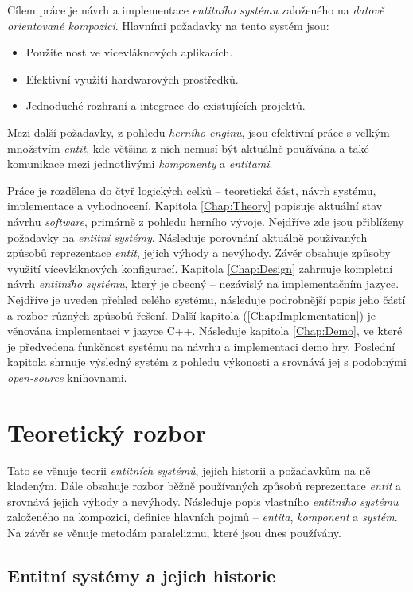 Cílem práce je návrh a implementace \emph{entitního systému} založeného na \emph{datově orientované kompozici}. Hlavními požadavky na tento systém jsou: 
\begin{itemize}
	\item Použitelnost ve vícevláknových aplikacích.
	\item Efektivní využití hardwarových prostředků.
	\item Jednoduché rozhraní a integrace do existujících projektů.
\end{itemize}
Mezi další požadavky, z pohledu \emph{herního enginu}, jsou efektivní práce s velkým množstvím \emph{entit}, kde většina z nich nemusí být aktuálně používána a také komunikace mezi jednotlivými \emph{komponenty} a \emph{entitami}.

Práce je rozdělena do čtyř logických celků -- teoretická část, návrh systému, implementace a vyhodnocení. Kapitola \ref{Chap:Theory} popisuje aktuální stav návrhu \emph{software}, primárně z pohledu herního vývoje. Nejdříve zde jsou přiblíženy požadavky na \emph{entitní systémy}. Následuje porovnání aktuálně používaných způsobů reprezentace \emph{entit}, jejich výhody a nevýhody. Závěr obsahuje způsoby využití vícevláknových konfigurací. Kapitola \ref{Chap:Design} zahrnuje kompletní návrh \emph{entitního systému}, který je obecný -- nezávislý na implementačním jazyce. Nejdříve je uveden přehled celého systému, následuje podrobnější popis jeho částí a rozbor různých způsobů řešení. Další kapitola (\ref{Chap:Implementation}) je věnována implementaci v jazyce C++. Následuje kapitola \ref{Chap:Demo}, ve které je předvedena funkčnost systému na návrhu a implementaci demo hry. Poslední kapitola shrnuje výsledný systém z pohledu výkonosti a srovnává jej s podobnými \emph{open-source} knihovnami.

\chapter{Teoretický rozbor}

Tato se věnuje teorii \emph{entitních systémů}, jejich historii a požadavkům na ně kladeným. Dále obsahuje rozbor běžně používaných způsobů reprezentace \emph{entit} a srovnává jejich výhody a nevýhody. Následuje popis vlastního \emph{entitního systému} založeného na kompozici, definice hlavních pojmů -- \emph{entita}, \emph{komponent} a \emph{systém}. Na závěr se věnuje metodám paralelizmu, které jsou dnes používány.

\section{Entitní systémy a jejich historie}
\blind[1]

